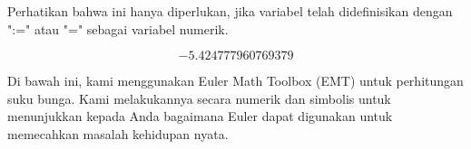 \documentclass[a4paper,10pt]{article}
\begin{document}
\begin{eulernotebook}
\begin{eulercomment}
\begin{eulercomment}
\begin{eulercomment}
\begin{eulercomment}
\begin{eulercomment}
\begin{eulercomment}
\begin{eulercomment}
Perhatikan bahwa ini hanya diperlukan, jika variabel telah
didefinisikan dengan ":=" atau "=" sebagai variabel numerik.
\end{eulercomment}
\begin{eulerformula}
\[
-5.424777960769379
\]
\end{eulerformula}
\begin{eulercomment}
\begin{eulercomment}
\begin{eulercomment}
Di bawah ini, kami menggunakan Euler Math Toolbox (EMT) untuk
perhitungan suku bunga. Kami melakukannya secara numerik dan simbolis
untuk menunjukkan kepada Anda bagaimana Euler dapat digunakan untuk
memecahkan masalah kehidupan nyata.


\end{eulercomment}
\end{eulercomment}
\end{eulercomment}
\end{eulercomment}
\end{eulercomment}
\end{eulercomment}
\end{eulercomment}
\end{eulercomment}
\end{eulercomment}
\end{eulernotebook}
\end{document}
